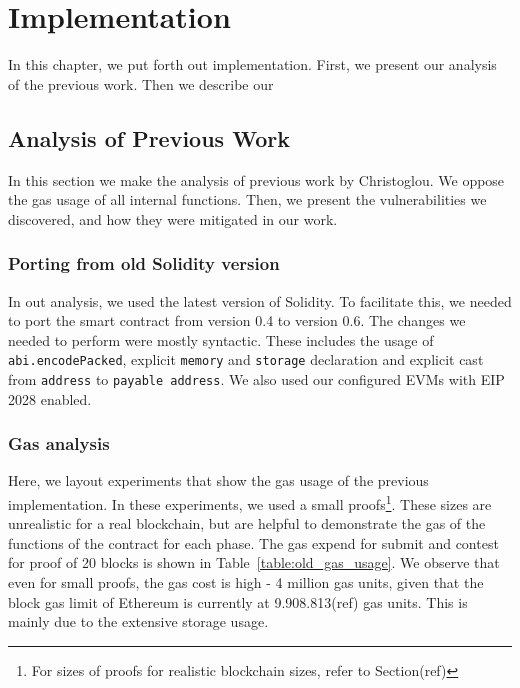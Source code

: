 \chapter{Implementation}

In this chapter, we put forth out implementation. First, we present our
analysis of the previous work. Then we describe our

\section{Analysis of Previous Work}

In this section we make the analysis of previous work by Christoglou. We oppose
the gas usage of all internal functions. Then, we present the vulnerabilities
we discovered, and how they were mitigated in our work.

\subsection{Porting from old Solidity version}

In out analysis, we used the latest version of Solidity. To facilitate this, we
needed to port the smart contract from version 0.4 to version 0.6. The changes
we needed to perform were mostly syntactic. These includes the usage of
\texttt{abi.encodePacked}, explicit \texttt{memory} and \texttt{storage}
declaration and explicit cast from \texttt{address} to \texttt{payable
address}. We also used our configured EVMs with EIP 2028 enabled.

\subsection{Gas analysis}

Here, we layout experiments that show the gas usage of the previous
implementation. In these experiments, we used a small proofs\footnote{For sizes
of proofs for realistic blockchain sizes, refer to Section(ref)}. These sizes
are unrealistic for a real blockchain, but are helpful to demonstrate the gas
of the functions of the contract for each phase. The gas expend for submit and
contest for proof of 20 blocks is shown in Table~\ref{table:old_gas_usage}. We
observe that even for small proofs, the gas cost is high - 4 million gas units,
given that the block gas limit of Ethereum is currently at 9.908.813(ref) gas
units. This is mainly due to the extensive storage usage.


